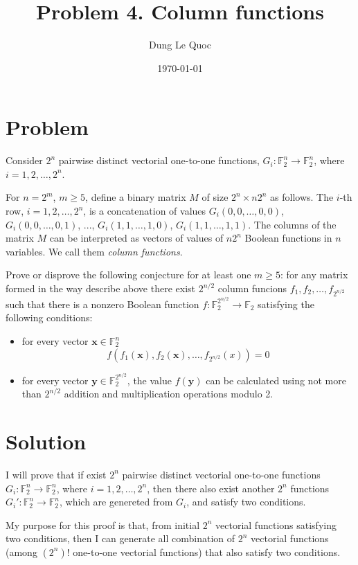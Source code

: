 \documentclass{article}
\title{Problem 4. Column functions}
\author{Dung Le Quoc}
\date{\today}
\newcommand{\FF}{\mathbb{F}}
\begin{document}
\maketitle

\section{Problem}

Consider $2^n$ pairwise distinct vectorial one-to-one functions, $G_i: \FF_2^n \to \FF_2^n$, where $i=1, 2, \ldots, 2^n$.

For $n = 2^m$, $m \geqslant 5$, define a binary matrix $M$ of size $2^n \times n 2^n$ as follows. The $i$-th row, $i=1, 2, \ldots, 2^n$, is a concatenation of values $G_i(0, 0, \ldots, 0, 0)$, $G_i(0, 0, \ldots, 0, 1)$, ..., $G_i(1, 1, \ldots, 1, 0)$, $G_i(1, 1, \ldots, 1, 1)$. The columns of the matrix $M$ can be interpreted as vectors of values of $n 2^n$ Boolean functions in $n$ variables. We call them \textit{column functions}.

Prove or disprove the following conjecture for at least one $m \geqslant 5$: for any matrix formed in the way describe above there exist $2^{n/2}$ column funcions $f_1, f_2, \ldots, f_{2^{n/2}}$ such that there is a nonzero Boolean function $f: \FF_2^{2^{n/2}} \to \FF_2$ satisfying the following conditions:

\begin{itemize}
    \item for every vector $\bm{x} \in \FF_2^n$ \[f(f_1(\bm{x}), f_2(\bm{x}), \ldots, f_{2^{n/2}}(x)) = 0 \]
    \item for every vector $\bm{y} \in \FF_2^{2^{n/2}}$, the value $f(\bm{y})$ can be calculated using not more than $2^{n/2}$ addition and multiplication operations modulo 2.
\end{itemize}

\section{Solution}

I will prove that if exist $2^n$ pairwise distinct vectorial one-to-one functions $G_i: \FF_2^n \to \FF_2^n$, where $i=1, 2, \ldots, 2^n$, then there also exist another $2^n$ functions $G_i': \FF_2^n \to \FF_2^n$, which are genereted from $G_i$, and satisfy two conditions.

My purpose for this proof is that, from initial $2^n$ vectorial functions satisfying two conditions, then I can generate all combination of $2^n$ vectorial functions (among $(2^n)!$ one-to-one vectorial functions) that also satisfy two conditions.
\end{document}
